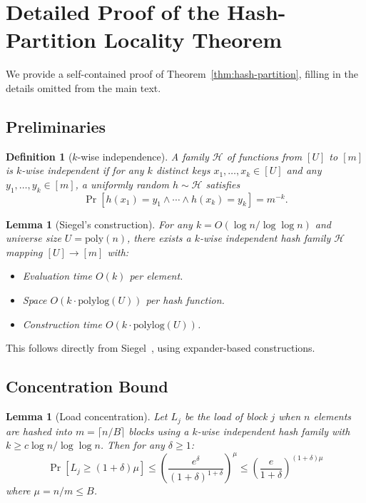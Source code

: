 \documentclass[11pt]{article}
\newtheorem{lemma}[theorem]{Lemma}
\newtheorem{definition}[theorem]{Definition}
\begin{document}
\section{Detailed Proof of the Hash-Partition Locality Theorem}
\label{app:proof}

We provide a self-contained proof of Theorem~\ref{thm:hash-partition},
filling in the details omitted from the main text.

\subsection{Preliminaries}

\begin{definition}[$k$-wise independence]
A family $\mathcal{H}$ of functions from $[U]$ to $[m]$ is $k$-wise
independent if for any $k$ distinct keys $x_1, \ldots, x_k \in [U]$
and any $y_1, \ldots, y_k \in [m]$, a uniformly random
$h \sim \mathcal{H}$ satisfies
\[
  \Pr[h(x_1) = y_1 \wedge \cdots \wedge h(x_k) = y_k] = m^{-k}.
\]
\end{definition}

\begin{lemma}[Siegel's construction]
\label{lem:siegel}
For any $k = O(\!\log n / \log\log n)$ and universe size $U = \text{poly}(n)$,
there exists a $k$-wise independent hash family $\mathcal{H}$ mapping
$[U] \to [m]$ with:
\begin{itemize}
\item Evaluation time $O(k)$ per element.
\item Space $O(k \cdot \text{polylog}(U))$ per hash function.
\item Construction time $O(k \cdot \text{polylog}(U))$.
\end{itemize}
\end{lemma}

This follows directly from Siegel~\cite{siegel2004hash}, using
expander-based constructions.

\subsection{Concentration Bound}

\begin{lemma}[Load concentration]
\label{lem:concentration}
Let $L_j$ be the load of block $j$ when $n$ elements are hashed into
$m = \lceil n/B \rceil$ blocks using a $k$-wise independent hash
family with $k \ge c\log n / \log\log n$.  Then for any
$\delta \ge 1$:
\[
  \Pr[L_j \ge (1+\delta)\mu] \le \left(\frac{e^\delta}{(1+\delta)^{1+\delta}}\right)^{\mu}
  \le \left(\frac{e}{1+\delta}\right)^{(1+\delta)\mu}
\]
where $\mu = n/m \le B$.
\end{lemma}
\end{document}

